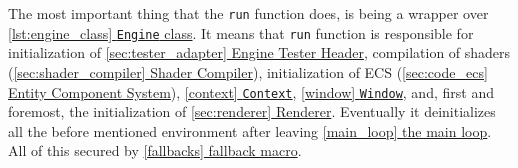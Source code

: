 The most important thing that the \texttt{run} function does, is being a wrapper over \hyperref[lst:engine_class]{\ref*{lst:engine_class} \texttt{Engine} class}. It means that \texttt{run} function is responsible for initialization of \hyperref[sec:tester_adapter]{\ref*{sec:tester_adapter} Engine Tester Header}, compilation of shaders (\hyperref[sec:shader_compiler]{\ref*{sec:shader_compiler} Shader Compiler}), initialization of ECS (\hyperref[sec:code_ecs]{\ref*{sec:code_ecs} Entity Component System}), \hyperref[context]{\ref*{context} \texttt{Context}}, \hyperref[window]{\ref*{window} \texttt{Window}}, and, first and foremost, the initialization of \hyperref[sec:renderer]{\ref*{sec:renderer} Renderer}. Eventually it deinitializes all the before mentioned environment after leaving \hyperref[main_loop]{\ref*{main_loop} the main loop}. All of this secured by \hyperref[fallbacks]{\ref*{fallbacks} fallback macro}.
